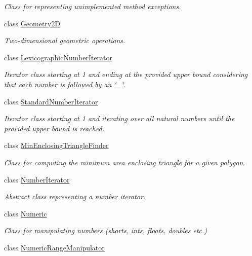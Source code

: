 \begin{DoxyCompactItemize}
\begin{DoxyCompactList}\small\item\em Class for representing unimplemented method exceptions. \end{DoxyCompactList}\item 
class \hyperlink{classmultiscale_1_1Geometry2D}{Geometry2\-D}
\begin{DoxyCompactList}\small\item\em Two-\/dimensional geometric operations. \end{DoxyCompactList}\item 
class \hyperlink{classmultiscale_1_1LexicographicNumberIterator}{Lexicographic\-Number\-Iterator}
\begin{DoxyCompactList}\small\item\em Iterator class starting at 1 and ending at the provided upper bound considering that each number is followed by an \char`\"{}\-\_\-\char`\"{}. \end{DoxyCompactList}\item 
class \hyperlink{classmultiscale_1_1StandardNumberIterator}{Standard\-Number\-Iterator}
\begin{DoxyCompactList}\small\item\em Iterator class starting at 1 and iterating over all natural numbers until the provided upper bound is reached. \end{DoxyCompactList}\item 
class \hyperlink{classmultiscale_1_1MinEnclosingTriangleFinder}{Min\-Enclosing\-Triangle\-Finder}
\begin{DoxyCompactList}\small\item\em Class for computing the minimum area enclosing triangle for a given polygon. \end{DoxyCompactList}\item 
class \hyperlink{classmultiscale_1_1NumberIterator}{Number\-Iterator}
\begin{DoxyCompactList}\small\item\em Abstract class representing a number iterator. \end{DoxyCompactList}\item 
class \hyperlink{classmultiscale_1_1Numeric}{Numeric}
\begin{DoxyCompactList}\small\item\em Class for manipulating numbers (shorts, ints, floats, doubles etc.) \end{DoxyCompactList}\item 
class \hyperlink{classmultiscale_1_1NumericRangeManipulator}{Numeric\-Range\-Manipulator}

\end{DoxyCompactItemize}
